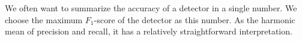 \label{sec:eval}

We often want to summarize the accuracy of a detector in a single number. We choose the maximum $F_1$-score of the detector as this number. As the harmonic mean of precision and recall, it has a relatively straightforward interpretation.
